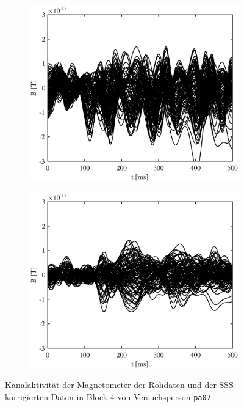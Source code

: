 \documentclass[doc,a4paper,12pt]{apa6}
\begin{document}
\begin{figure}
  \captionsetup{justification=centering}
  \begin{subfigure}[c]{0.47\textwidth}
    \includegraphics[width=\textwidth]{ergebnisse/butterfly/pa07a4_eve2_raw_mag_butterfly.eps}
    \label{img:butterfly:pa07:4:raw}
  \end{subfigure}\hspace*{0.04\textwidth}
  \begin{subfigure}[c]{0.47\textwidth}
    \includegraphics[width=\textwidth]{ergebnisse/butterfly/pa07a4_eve2_sss_mag_butterfly.eps}
    \label{img:butterfly:pa07:4:sss}
  \end{subfigure}
  \captionsetup{justification=justified}
  \vspace*{3mm}
  \caption{Kanalaktivität der Magnetometer der Rohdaten und der SSS-korrigierten Daten in Block 4 von Versuchsperson \texttt{pa07}.}
  \label{img:butterfly:pa07:4}
\end{figure}
\end{document}
